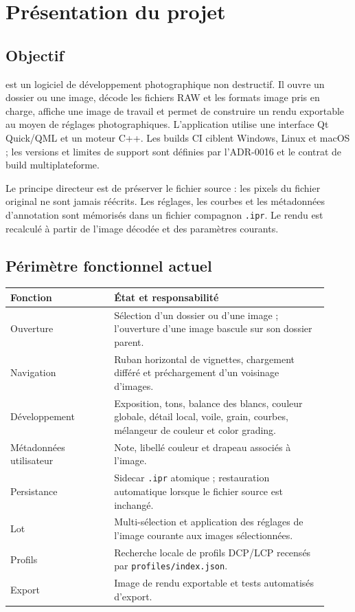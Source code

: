 \chapter{Présentation du projet}
\label{chap:projet}

\section{Objectif}

\IPR{} est un logiciel de développement photographique non destructif. Il ouvre un dossier ou une image, décode les fichiers RAW et les formats image pris en charge, affiche une image de travail et permet de construire un rendu exportable au moyen de réglages photographiques. L'application utilise une interface Qt Quick/QML et un moteur C++. Les builds CI ciblent Windows, Linux et macOS ; les versions et limites de support sont définies par l'ADR-0016 et le contrat de build multiplateforme.

Le principe directeur est de préserver le fichier source : les pixels du fichier original ne sont jamais réécrits. Les réglages, les courbes et les métadonnées d'annotation sont mémorisés dans un fichier compagnon \texttt{.ipr}. Le rendu est recalculé à partir de l'image décodée et des paramètres courants.

\section{Périmètre fonctionnel actuel}

\begin{longtable}{p{0.30\linewidth}p{0.62\linewidth}}
\toprule
Fonction & État et responsabilité \\
\midrule
Ouverture & Sélection d'un dossier ou d'une image ; l'ouverture d'une image bascule sur son dossier parent. \\
Navigation & Ruban horizontal de vignettes, chargement différé et préchargement d'un voisinage d'images. \\
Développement & Exposition, tons, balance des blancs, couleur globale, détail local, voile, grain, courbes, mélangeur de couleur et color grading. \\
Métadonnées utilisateur & Note, libellé couleur et drapeau associés à l'image. \\
Persistance & Sidecar \texttt{.ipr} atomique ; restauration automatique lorsque le fichier source est inchangé. \\
Lot & Multi-sélection et application des réglages de l'image courante aux images sélectionnées. \\
Profils & Recherche locale de profils DCP/LCP recensés par \texttt{profiles/index.json}. \\
Export & Image de rendu exportable et tests automatisés d'export. \\
\bottomrule
\end{longtable}

